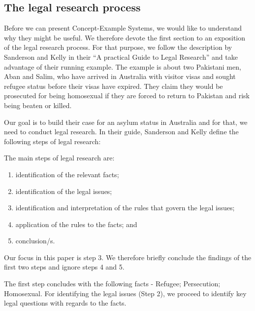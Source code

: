 \subsection{The legal research process}

Before we can present Concept-Example Systems, we would like to understand why they might be useful. We therefore devote the first section to an exposition of the legal research process. For that purpose, we follow the description by Sanderson and Kelly in their ``A practical Guide to Legal Research'' \cite{sanderson2021practical} and take advantage of their running example. 
The example is about two Pakistani men, Aban and Salim, who have arrived in Australia with visitor visas and sought refugee status before their visas have expired. They claim they would be prosecuted for being homosexual if they are forced to return to Pakistan and risk being beaten or killed.

Our goal is to build their case for an asylum status in Australia and for that, we need to conduct legal research. 
In their guide, Sanderson and Kelly define the following steps of legal research:

\begin{definition}
The main steps of legal research are:
\begin{enumerate}
    \item identification of the relevant facts;
    \item identification of the legal issues;
    \item identification and interpretation of the rules that govern the legal issues;
    \item application of the rules to the facts; and
    \item conclusion/s.
\end{enumerate}
\end{definition}

Our focus in this paper is step 3. We therefore briefly conclude the findings of the first two steps and ignore steps 4 and 5.

The first step concludes with the following facts - Refugee; Persecution; Homosexual. 
For identifying the legal issues (Step 2), we proceed to identify key legal questions with regards to the facts.

